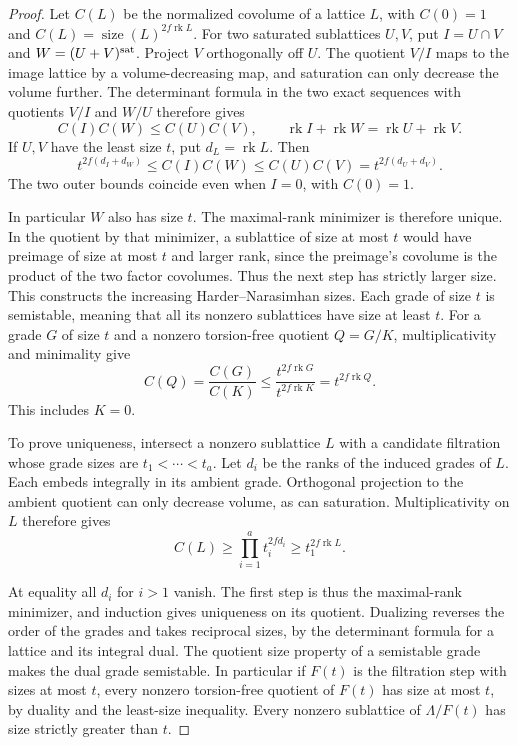\begin{proof}

Let \(C(L)\) be the normalized covolume of a lattice \(L\),
with \(C(0)=1\) and \(C(L)=\operatorname{size}(L)^{2f\operatorname{rk}L}\).
For two saturated sublattices \(U,V\), put \(I=U\cap V\) and
\(W=(U+V)^{\rm sat}\). Project \(V\) orthogonally off \(U\).
The quotient \(V/I\) maps to the image lattice by a
volume-decreasing map, and saturation can only decrease the
volume further. The determinant formula in the two exact sequences
with quotients \(V/I\) and \(W/U\) therefore gives
\[
 C(I)C(W)\le C(U)C(V),\qquad
 \operatorname{rk}I+\operatorname{rk}W
                  =\operatorname{rk}U+\operatorname{rk}V .
\]
If \(U,V\) have the least size \(t\), put \(d_L=\operatorname{rk}L\).
Then
\[
 t^{2f(d_I+d_W)}\le C(I)C(W)\le C(U)C(V)
              =t^{2f(d_U+d_V)} .
\]
The two outer bounds coincide even when \(I=0\), with \(C(0)=1\).

In particular
\(W\) also has size \(t\). The maximal-rank minimizer is therefore
unique. In the quotient by that minimizer, a sublattice of size at
most \(t\) would have preimage of size at most \(t\) and larger
rank, since the preimage's covolume is the product of the two
factor covolumes. Thus the next step has strictly larger size. This constructs the increasing
Harder--Narasimhan sizes. Each grade of size \(t\) is
semistable, meaning that all its nonzero sublattices have
size at least \(t\). For a grade \(G\) of size \(t\) and a nonzero torsion-free
quotient \(Q=G/K\), multiplicativity and minimality give
\[
 C(Q)=\frac{C(G)}{C(K)}\le
       \frac{t^{2f\operatorname{rk}G}}{t^{2f\operatorname{rk}K}}
       =t^{2f\operatorname{rk}Q}.
\]
This includes \(K=0\).

To prove uniqueness, intersect a nonzero sublattice \(L\) with a
candidate filtration whose grade sizes are \(t_1<\cdots<t_a\).
Let \(d_i\) be the ranks of the induced grades of \(L\).
Each embeds integrally in its ambient grade. Orthogonal projection
to the ambient quotient can only decrease volume, as can saturation.
Multiplicativity on \(L\) therefore gives
\[
 C(L)\ge\prod_{i=1}^a t_i^{2fd_i}\ge t_1^{2f\operatorname{rk}L}.
\]

At equality all \(d_i\) for \(i>1\) vanish. The first step is thus
the maximal-rank minimizer, and induction gives uniqueness on its
quotient. Dualizing reverses the order of the
grades and takes reciprocal sizes, by the determinant
formula for a lattice and its integral dual. The quotient
size property of a semistable grade makes the dual grade
semistable. In particular if \(F(t)\) is the filtration
step with sizes at most \(t\), every nonzero torsion-free
quotient of \(F(t)\) has size at most \(t\), by duality and the
least-size inequality. Every nonzero sublattice of
\(\Lambda/F(t)\) has size strictly greater than \(t\).
\end{proof}

